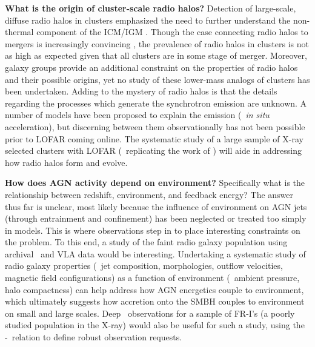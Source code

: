 \documentclass[11pt]{article}
\begin{document}
{\bf{What is the origin of cluster-scale radio halos?}} Detection of
large-scale, diffuse radio halos in clusters emphasized the need to
further understand the non-thermal component of the ICM/IGM
\cite[\eg][]{2009ApJ...704L..54G, 2009A&A...507.1257G}. Though the
case connecting radio halos to mergers is increasingly convincing
\cite{2009A&A...507..661B}, the prevalence of radio halos in clusters
is not as high as expected given that all clusters are in some stage
of merger. Moreover, galaxy groups provide an additional constraint on
the properties of radio halos and their possible origins, yet no study
of these lower-mass analogs of clusters has been undertaken. Adding to
the mystery of radio halos is that the details regarding the processes
which generate the synchrotron emission are unknown. A number of
models have been proposed to explain the emission (\eg\ {\textit{in
    situ}} acceleration), but discerning between them observationally
has not been possible prior to LOFAR coming online. The systematic
study of a large sample of X-ray selected clusters with LOFAR
(\eg\ replicating the work of \cite{2007A&A...463..937V,
  2008A&A...484..327V}) will aide in addressing how radio halos form
and evolve.

{\bf{How does AGN activity depend on environment?}} Specifically what
is the relationship between redshift, environment, and feedback
energy? The answer thus far is unclear, most likely because the
influence of environment on AGN jets (through entrainment and
confinement) has been neglected or treated too simply in models. This
is where observations step in to place interesting constraints on the
problem. To this end, a study of the faint radio galaxy population
using archival \chandra\ and VLA data would be
interesting. Undertaking a systematic study of radio galaxy properties
(\ie\ jet composition, morphologies, outflow velocities, magnetic
field configurations) as a function of environment (\ie\ ambient
pressure, halo compactness) can help address how AGN energetics couple
to environment, which ultimately suggests how accretion onto the SMBH
couples to environment on small and large scales. Deep
\chandra\ observations for a sample of FR-I's (a poorly studied
population in the X-ray) would also be useful for such a study, using
the \pjet-\prad\ relation to define robust observation requests.
\end{document}

